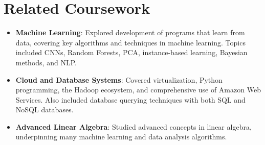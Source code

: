 \documentclass[letterpaper,11pt]{article}
\newcommand{\resumeItem}[2]{
  \item\small{
    \textbf{#1}{: #2 \vspace{-2pt}}
  }
}
\newcommand{\resumeSubItem}[2]{\resumeItem{#1}{#2}\vspace{-4pt}}
\newcommand{\resumeSubHeadingListStart}{\begin{itemize}[leftmargin=*]}
\newcommand{\resumeSubHeadingListEnd}{\end{itemize}}
\begin{document}
\section{Related Coursework}
  \resumeSubHeadingListStart
    \resumeSubItem{Machine Learning}
      {Explored development of programs that learn from data, covering key algorithms and techniques in machine learning. Topics included CNNs, Random Forests, PCA, instance-based learning, Bayesian methods, and NLP.}
    \resumeSubItem{Cloud and Database Systems}
      {Covered virtualization, Python programming, the Hadoop ecosystem, and comprehensive use of Amazon Web Services. Also included database querying techniques with both SQL and NoSQL databases.}
    \resumeSubItem{Advanced Linear Algebra}
      {Studied advanced concepts in linear algebra, underpinning many machine learning and data analysis algorithms.}
  \resumeSubHeadingListEnd

\end{document}
